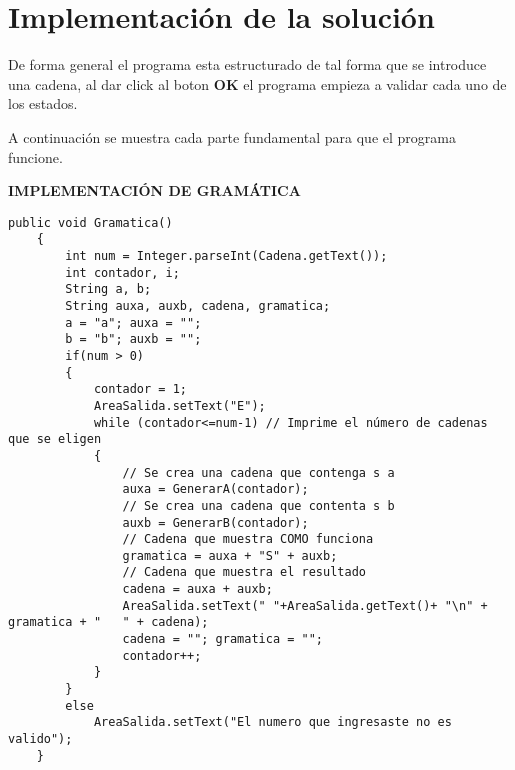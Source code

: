 \documentclass[12pt]{article}
\begin{document}

	\section{Implementación de la solución}

	De forma general el programa esta estructurado de tal forma que se introduce una cadena, 
	al dar click al boton \textbf{OK} el programa empieza a validar cada uno de los estados.

	A continuación se muestra cada parte fundamental para que el programa funcione.

	\textbf{IMPLEMENTACIÓN DE GRAMÁTICA}
	\begin{lstlisting}[style=Java]
	public void Gramatica()
	{
		int num = Integer.parseInt(Cadena.getText());
		int contador, i;
		String a, b;
		String auxa, auxb, cadena, gramatica;
		a = "a"; auxa = "";
		b = "b"; auxb = "";
		if(num > 0)
		{
			contador = 1;
			AreaSalida.setText("E");
			while (contador<=num-1) // Imprime el número de cadenas que se eligen
			{
				// Se crea una cadena que contenga s a
				auxa = GenerarA(contador);
				// Se crea una cadena que contenta s b
				auxb = GenerarB(contador);
				// Cadena que muestra COMO funciona
				gramatica = auxa + "S" + auxb;
				// Cadena que muestra el resultado
				cadena = auxa + auxb;
				AreaSalida.setText(" "+AreaSalida.getText()+ "\n" + gramatica + "   " + cadena);
				cadena = ""; gramatica = "";
				contador++;
			}
		}
		else 
			AreaSalida.setText("El numero que ingresaste no es valido");
	}
	\end{lstlisting}			
\end{document}
